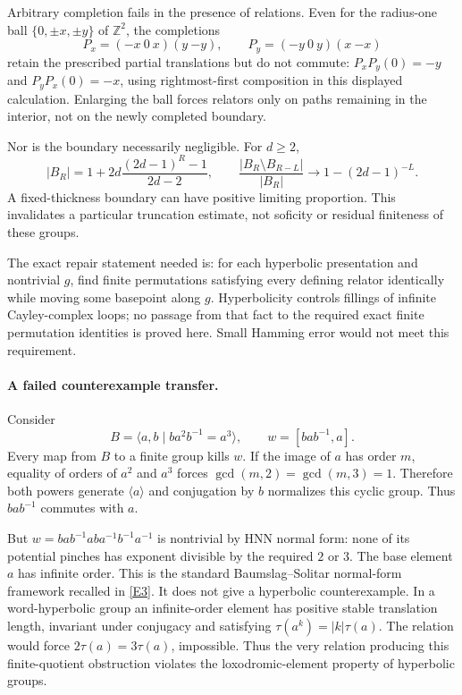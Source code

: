 \documentclass[11pt,a4paper]{article}
\newcommand{\Z}{\mathbb{Z}}
\newcommand{\eref}[2]{\hyperlink{extra:#1:#2}{[E#2]}}
\numberwithin{equation}{section}
\begin{document}
Arbitrary completion fails in the presence of relations. Even for the
radius-one ball $\{0,\pm x,\pm y\}$ of $\Z^2$, the completions
\[
 P_x=(-x\ 0\ x)(y\ {-y}),\qquad
 P_y=(-y\ 0\ y)(x\ {-x})
\]
retain the prescribed partial translations but do not commute:
$P_xP_y(0)=-y$ and $P_yP_x(0)=-x$, using rightmost-first composition in
this displayed calculation. Enlarging the ball forces relators only on
paths remaining in the interior, not on the newly completed boundary.

Nor is the boundary necessarily negligible. For $d\ge2$,
\[
 |B_R|=1+2d\frac{(2d-1)^R-1}{2d-2},\qquad
 \frac{|B_R\setminus B_{R-L}|}{|B_R|}
 \longrightarrow1-(2d-1)^{-L}.
\]
A fixed-thickness boundary can have positive limiting proportion. This
invalidates a particular truncation estimate, not soficity or residual
finiteness of these groups.

The exact repair statement needed is: for each hyperbolic presentation and
nontrivial $g$, find finite permutations satisfying every defining relator
identically while moving some basepoint along $g$. Hyperbolicity controls
fillings of infinite Cayley-complex loops; no passage from that fact to the
required exact finite permutation identities is proved here. Small Hamming
error would not meet this requirement.

\paragraph{A failed counterexample transfer.}
Consider
\[
 B=\langle a,b\mid ba^2b^{-1}=a^3\rangle,
 \qquad w=[bab^{-1},a].
\]
Every map from $B$ to a finite group kills $w$. If the image of $a$ has
order $m$, equality of orders of $a^2$ and $a^3$ forces
$\gcd(m,2)=\gcd(m,3)=1$. Therefore both powers generate $\langle a\rangle$
and conjugation by $b$ normalizes this cyclic group. Thus $bab^{-1}$
commutes with $a$.

But $w=bab^{-1}ab a^{-1}b^{-1}a^{-1}$ is nontrivial by HNN normal form:
none of its potential pinches has exponent divisible by the required
$2$ or $3$. The base element $a$ has infinite order. This is the standard
Baumslag--Solitar normal-form framework recalled in \eref{statement}{3}.
It does not give a hyperbolic counterexample. In a word-hyperbolic group an
infinite-order element has positive stable translation length, invariant
under conjugacy and satisfying $\tau(a^k)=|k|\tau(a)$. The relation would
force $2\tau(a)=3\tau(a)$, impossible. Thus the very relation producing
this finite-quotient obstruction violates the loxodromic-element property
of hyperbolic groups.
\end{document}
